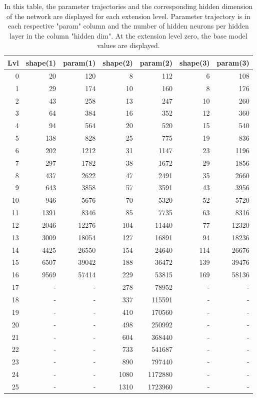 \begin{table}
    \caption{In this table, the parameter trajectories and the corresponding hidden dimension of the network are displayed for each extension level. Parameter trajectory is in each respective "param" column and the number of hidden neurons per hidden layer in the column "hidden dim". At the extension level zero, the base model values are displayed.}
    \label{tab:trajectory}
    \begin{tabular}{rrrrrrr}
    \toprule
    Lvl & shape(1) & param(1) & shape(2) & param(2) & shape(3) & param(3) \\
    \midrule
    0 & 20 & 120 & 8 & 112 & 6 & 108 \\
    1 & 29 & 174 & 10 & 160 & 8 & 176 \\
    2 & 43 & 258 & 13 & 247 & 10 & 260 \\
    3 & 64 & 384 & 16 & 352 & 12 & 360 \\
    4 & 94 & 564 & 20 & 520 & 15 & 540 \\
    5 & 138 & 828 & 25 & 775 & 19 & 836 \\
    6 & 202 & 1212 & 31 & 1147 & 23 & 1196 \\
    7 & 297 & 1782 & 38 & 1672 & 29 & 1856 \\
    8 & 437 & 2622 & 47 & 2491 & 35 & 2660 \\
    9 & 643 & 3858 & 57 & 3591 & 43 & 3956 \\
    10 & 946 & 5676 & 70 & 5320 & 52 & 5720 \\
    11 & 1391 & 8346 & 85 & 7735 & 63 & 8316 \\
    12 & 2046 & 12276 & 104 & 11440 & 77 & 12320 \\
    13 & 3009 & 18054 & 127 & 16891 & 94 & 18236 \\
    14 & 4425 & 26550 & 154 & 24640 & 114 & 26676 \\
    15 & 6507 & 39042 & 188 & 36472 & 139 & 39476 \\
    16 & 9569 & 57414 & 229 & 53815 & 169 & 58136 \\
    17 & - & - & 278 & 78952 & - & - \\
    18 & - & - & 337 & 115591 & - & - \\
    19 & - & - & 410 & 170560 & - & - \\
    20 & - & - & 498 & 250992 & - & - \\
    21 & - & - & 604 & 368440 & - & - \\
    22 & - & - & 733 & 541687 & - & - \\
    23 & - & - & 890 & 797440 & - & - \\
    24 & - & - & 1080 & 1172880 & - & - \\
    25 & - & - & 1310 & 1723960 & - & - \\
    \bottomrule
    \end{tabular}
    \end{table}

